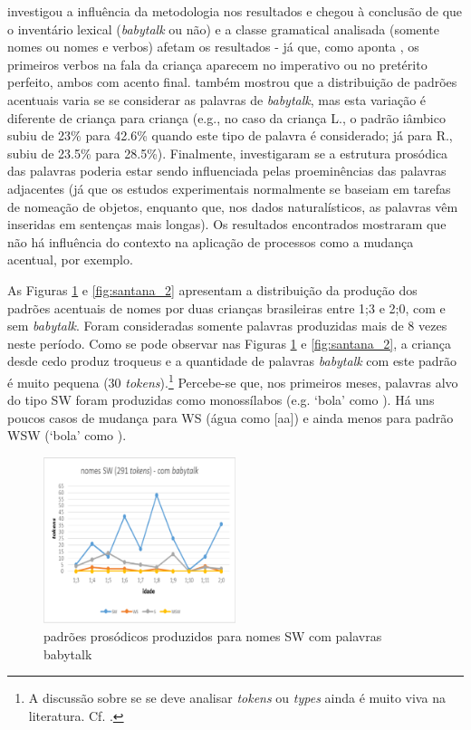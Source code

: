\documentclass[output=paper]{LSP/langsci}
\begin{document}
\citet{baia2008} investigou a influência da metodologia nos resultados e chegou à conclusão de que o inventário lexical (\textit{babytalk} ou não) e a classe gramatical analisada (somente nomes ou nomes e verbos) afetam os resultados - já que, como aponta \citet{santos2001}, os primeiros verbos na fala da criança aparecem no imperativo ou no pretérito perfeito, ambos com acento final. \citet{santos2007} também mostrou que a distribuição de padrões acentuais varia se se considerar as palavras de \textit{babytalk}, mas esta variação é diferente de criança para criança (e.g., no caso da criança L., o padrão iâmbico subiu de 23\% para 42.6\% quando este tipo de palavra é considerado; já para R., subiu de 23.5\% para 28.5\%). Finalmente, \citet{santosfikkert2007} investigaram se a estrutura prosódica das palavras poderia estar sendo influenciada pelas proeminências das palavras adjacentes (já que os estudos experimentais normalmente se baseiam em tarefas de nomeação de objetos, enquanto que, nos dados naturalísticos, as palavras vêm inseridas em sentenças mais longas). Os resultados encontrados mostraram que não há influência do contexto na aplicação de processos como a mudança acentual, por exemplo.

As Figuras \ref{fig:santana_1} e \ref{fig:santana_2} apresentam a distribuição da produção dos padrões acentuais de nomes por duas crianças brasileiras entre 1;3 e 2;0, com e sem \textit{babytalk}. Foram consideradas somente palavras produzidas mais de 8 vezes neste período. Como se pode observar nas Figuras \ref{fig:santana_1} e \ref{fig:santana_2}, a criança desde cedo produz troqueus e a quantidade de palavras \textit{babytalk} com este padrão é muito pequena (30 \textit{tokens}).\footnote{A discussão sobre se se deve analisar \textit{tokens} ou \textit{types} ainda é muito viva na literatura. Cf. \citealt{vigario_etal2010}.} Percebe-se que, nos primeiros meses, palavras alvo do tipo SW foram produzidas como monossílabos (e.g. `bola' como \ipa{[bo]}). Há uns poucos casos de mudança para WS (água como [a\pstr a]) e ainda menos para padrão WSW (`bola' como ).

\begin{figure}
\includegraphics[width=0.5\textwidth]{figures/santanafig1}
\caption{padrões prosódicos produzidos para nomes SW com palavras babytalk}
\label{fig:santana_1}
\end{figure}
\end{document}
